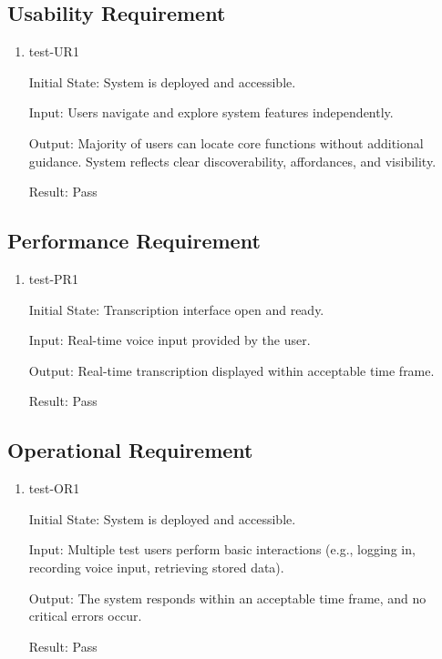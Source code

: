 \documentclass[12pt, titlepage]{article}
\begin{document}
\subsection{Usability Requirement} \label{section:4.2}

\begin{enumerate}

  \item {test-UR1} \label{test-UR1}

  Initial State: System is deployed and accessible.

  Input: Users navigate and explore system features independently.

  Output: Majority of users can locate core functions without additional guidance. System reflects clear discoverability, affordances, and visibility.

  Result: Pass

\end{enumerate}

\subsection{Performance Requirement} \label{section:4.3}

\begin{enumerate}
\item test-PR1 \label{test-PR1}

Initial State: Transcription interface open and ready.

Input: Real-time voice input provided by the user.

Output: Real-time transcription displayed within acceptable time frame.

Result: Pass 

\end{enumerate}

\subsection{Operational Requirement} \label{section:4.4}

\begin{enumerate}
\item test-OR1 \label{test-OR1}

Initial State: System is deployed and accessible.

Input: Multiple test users perform basic interactions (e.g., logging in, recording voice input, retrieving stored data).

Output: The system responds within an acceptable time frame, and no critical errors occur.

Result: Pass

\end{enumerate}
\end{document}
